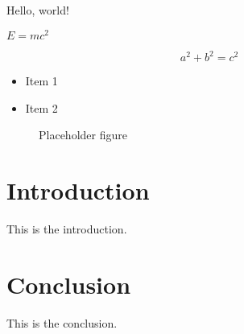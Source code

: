 \documentclass{article}
\begin{document}
Hello, world!

$E=mc^2$

\begin{equation}
a^2 + b^2 = c^2
\end{equation}

\begin{itemize}
    \item Item 1
    \item Item 2
\end{itemize}

\begin{figure}[h]
    \centering
    \caption{Placeholder figure}
    \label{fig:placeholder}
\end{figure}

\section{Introduction}

This is the introduction.

\section{Conclusion}

This is the conclusion.
\end{document}
